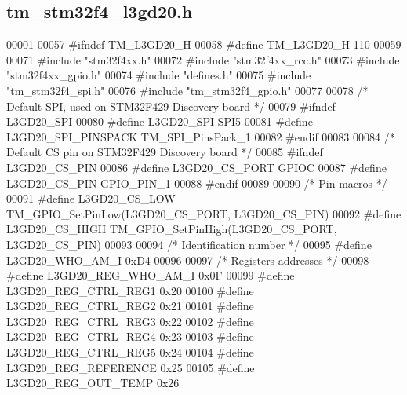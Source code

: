 \hypertarget{tm__stm32f4__l3gd20_8h_source}{}\subsection{tm\+\_\+stm32f4\+\_\+l3gd20.\+h}

\begin{DoxyCode}
00001 
00057 \textcolor{preprocessor}{#ifndef TM\_L3GD20\_H}
00058 \textcolor{preprocessor}{#define TM\_L3GD20\_H 110}
00059 
00071 \textcolor{preprocessor}{#include "stm32f4xx.h"}
00072 \textcolor{preprocessor}{#include "stm32f4xx\_rcc.h"}
00073 \textcolor{preprocessor}{#include "stm32f4xx\_gpio.h"}
00074 \textcolor{preprocessor}{#include "defines.h"}
00075 \textcolor{preprocessor}{#include "tm\_stm32f4\_spi.h"}
00076 \textcolor{preprocessor}{#include "tm\_stm32f4\_gpio.h"}
00077 
00078 \textcolor{comment}{/* Default SPI, used on STM32F429 Discovery board */}
00079 \textcolor{preprocessor}{#ifndef L3GD20\_SPI}
00080 \textcolor{preprocessor}{#define L3GD20\_SPI                  SPI5}
00081 \textcolor{preprocessor}{#define L3GD20\_SPI\_PINSPACK         TM\_SPI\_PinsPack\_1}
00082 \textcolor{preprocessor}{#endif}
00083 
00084 \textcolor{comment}{/* Default CS pin on STM32F429 Discovery board */}
00085 \textcolor{preprocessor}{#ifndef L3GD20\_CS\_PIN}
00086 \textcolor{preprocessor}{#define L3GD20\_CS\_PORT              GPIOC}
00087 \textcolor{preprocessor}{#define L3GD20\_CS\_PIN               GPIO\_PIN\_1}
00088 \textcolor{preprocessor}{#endif}
00089 
00090 \textcolor{comment}{/* Pin macros */}
00091 \textcolor{preprocessor}{#define L3GD20\_CS\_LOW               TM\_GPIO\_SetPinLow(L3GD20\_CS\_PORT, L3GD20\_CS\_PIN)}
00092 \textcolor{preprocessor}{#define L3GD20\_CS\_HIGH              TM\_GPIO\_SetPinHigh(L3GD20\_CS\_PORT, L3GD20\_CS\_PIN)}
00093 
00094 \textcolor{comment}{/* Identification number */}
00095 \textcolor{preprocessor}{#define L3GD20\_WHO\_AM\_I             0xD4}
00096 
00097 \textcolor{comment}{/* Registers addresses */}
00098 \textcolor{preprocessor}{#define L3GD20\_REG\_WHO\_AM\_I         0x0F}
00099 \textcolor{preprocessor}{#define L3GD20\_REG\_CTRL\_REG1        0x20}
00100 \textcolor{preprocessor}{#define L3GD20\_REG\_CTRL\_REG2        0x21}
00101 \textcolor{preprocessor}{#define L3GD20\_REG\_CTRL\_REG3        0x22}
00102 \textcolor{preprocessor}{#define L3GD20\_REG\_CTRL\_REG4        0x23}
00103 \textcolor{preprocessor}{#define L3GD20\_REG\_CTRL\_REG5        0x24}
00104 \textcolor{preprocessor}{#define L3GD20\_REG\_REFERENCE        0x25}
00105 \textcolor{preprocessor}{#define L3GD20\_REG\_OUT\_TEMP         0x26}

\end{DoxyCode}

